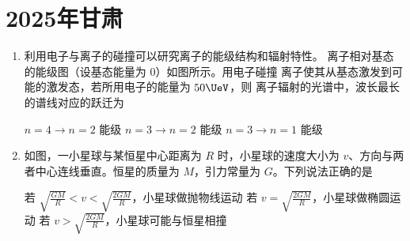 \documentclass[\gkver]{gaokaozhenti}
\begin{document}
\chapter{2025年甘肃}

\begin{enumerate}
\item
利用电子与离子的碰撞可以研究离子的能级结构和辐射特性。 离子相对基态的能级图（设基态能量为 0）如图所示。用电子碰撞  离子使其从基态激发到可能的激发态，若所用电子的能量为 $50 \UeV$，则  离子辐射的光谱中，波长最长的谱线对应的跃迁为


{$n = 4 \to n = 2$ 能级}
{$n = 3 \to n = 2$ 能级}
{$n = 3 \to n = 1$ 能级}


\item
如图，一小星球与某恒星中心距离为 $R$ 时，小星球的速度大小为 $v$、方向与两者中心连线垂直。恒星的质量为 $M$，引力常量为 $G$。下列说法正确的是

\onepicture[h=4.62cm]{}

{若 $\sqrt{\frac{GM}{R}} < v < \sqrt{\frac{2GM}{R}}$，小星球做抛物线运动}
{若 $v = \sqrt{\frac{2GM}{R}}$，小星球做椭圆运动}
{若 $v > \sqrt{\frac{2GM}{R}}$，小星球可能与恒星相撞}

\end{enumerate}
\end{document}
